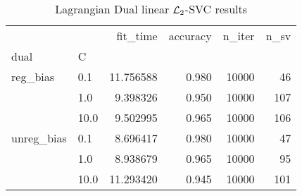 \begin{table}[H]
\centering
\caption{Lagrangian Dual linear $\protect \mathcal{L}_2$-SVC results}
\label{linear_lagrangian_dual_l2_svc_cv_results}
\begin{tabular}{llrrrr}
\toprule
           &      &   fit\_time &  accuracy &  n\_iter &  n\_sv \\
dual & C &            &           &         &       \\
\midrule
reg\_bias & 0.1  &  11.756588 &     0.980 &   10000 &    46 \\
           & 1.0  &   9.398326 &     0.950 &   10000 &   107 \\
           & 10.0 &   9.502995 &     0.965 &   10000 &   106 \\
unreg\_bias & 0.1  &   8.696417 &     0.980 &   10000 &    47 \\
           & 1.0  &   8.938679 &     0.965 &   10000 &    95 \\
           & 10.0 &  11.293420 &     0.945 &   10000 &   101 \\
\bottomrule
\end{tabular}
\end{table}
